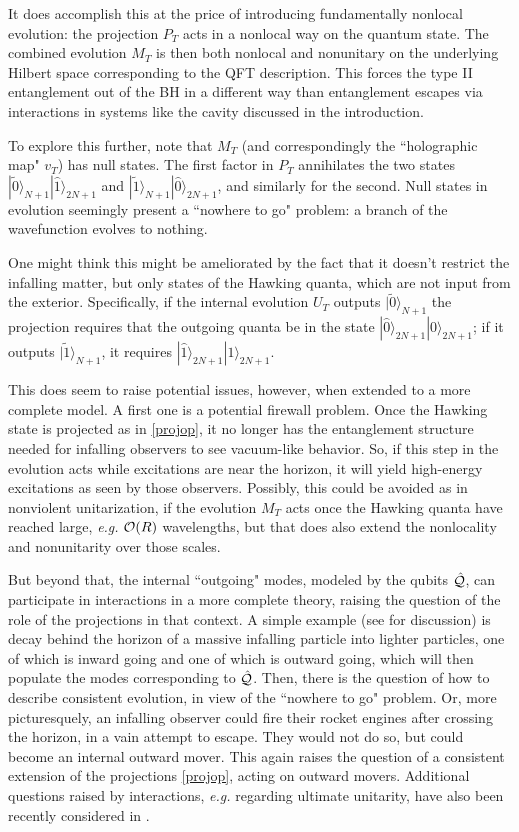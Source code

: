 \documentclass[11pt]{article}
\numberwithin{equation}{section}
\newcommand{\calo}{{\cal O}}
\newcommand{\calq}{{\cal Q}}
\begin{document}
It does accomplish this at the price of introducing fundamentally nonlocal evolution:  the projection $P_T$ acts in a nonlocal way on the quantum state.  The combined evolution $M_T$  is then both nonlocal and nonunitary on the underlying Hilbert space corresponding to the QFT description.  This forces the type II entanglement out of the BH in a different way than entanglement escapes via interactions in systems like the cavity discussed in the introduction.

To explore this further, note that $M_T$ (and correspondingly the ``holographic map" $v_T$) has null states.  The first factor in $P_T$ annihilates the two states $| \tilde 0\rangle_{N+1} | \hat 1\rangle_{2N+1}$ and $| \tilde 1\rangle_{N+1} | \hat 0\rangle_{2N+1}$, and similarly for the second.  Null states in evolution seemingly present a ``nowhere to go" problem:  a branch of the wavefunction evolves to nothing.  

One might think this might be ameliorated by the fact that it doesn't restrict the infalling matter, but only states of the Hawking quanta, which are not input from the exterior.  Specifically, if the internal evolution $U_T$ outputs $|\tilde 0\rangle_{N+1}$ the projection requires that the outgoing quanta be in the state $|\hat 0\rangle_{2N+1}| 0\rangle_{2N+1}$; if it outputs $|\tilde 1\rangle_{N+1}$, it requires $|\hat 1\rangle_{2N+1}| 1\rangle_{2N+1}$.

This does seem to raise potential issues, however, when extended to a more complete model.  A first one is a potential firewall problem.  Once the Hawking state is projected as in \eqref{projop}, it no longer has the entanglement structure needed for infalling observers to see vacuum-like behavior.  So, if this step in the evolution acts while excitations are near the horizon, it will yield high-energy excitations as seen by those observers.  Possibly, this could be avoided as in nonviolent unitarization, if the evolution $M_T$ acts once the Hawking quanta have reached large, {\it e.g.} $\calo(R)$ wavelengths, but that does also extend the nonlocality and nonunitarity over those scales.

 But beyond that, the internal ``outgoing" modes, modeled by the qubits $\hat \calq$, can participate in interactions in a more complete theory, raising the question of the role of the projections in that context.  A simple example (see \cite{SE2d} for discussion) is decay behind the horizon of a massive infalling particle into lighter particles, one of which is inward going and one of which is outward going, which will then populate the modes corresponding to $\hat \calq$.  Then, there is the question of how to describe consistent evolution, in view of the ``nowhere to go" problem.  Or, more picturesquely, an infalling observer could fire their rocket engines after crossing the horizon, in a vain attempt to escape.  They would not do so, but could become an internal outward mover.  This again raises the question of a consistent extension of the projections \eqref{projop}, acting on outward movers.
Additional questions raised by interactions, {\it e.g.} regarding ultimate unitarity, have also been recently considered in \cite{KiPr}.
\end{document}
